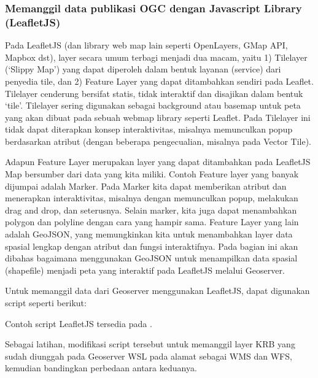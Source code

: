 \documentclass[letterpaper,10pt,english]{sphinxmanual}
\begin{document}
\subsubsection{Memanggil data publikasi OGC dengan Javascript Library (LeafletJS)}
\label{\detokenize{sesi3/konsumsiogc:memanggil-data-publikasi-ogc-dengan-javascript-library-leafletjs}}
Pada LeafletJS (dan library web map lain seperti OpenLayers, GMap API, Mapbox dst), layer secara umum terbagi menjadi dua macam, yaitu 1) Tilelayer (‘Slippy Map’) yang dapat diperoleh dalam bentuk layanan (service) dari penyedia tile, dan 2) Feature Layer yang dapat ditambahkan sendiri pada Leaflet. Tilelayer cenderung bersifat statis, tidak interaktif dan disajikan dalam bentuk ‘tile’. Tilelayer sering digunakan sebagai background atau basemap untuk peta yang akan dibuat pada sebuah webmap library seperti Leaflet. Pada Tilelayer ini tidak dapat diterapkan konsep interaktivitas, misalnya memunculkan popup berdasarkan atribut (dengan beberapa pengecualian, misalnya pada Vector Tile).

Adapun Feature Layer merupakan layer yang dapat ditambahkan pada LeafletJS Map bersumber dari data yang kita miliki. Contoh Feature layer yang banyak dijumpai adalah Marker. Pada Marker kita dapat memberikan atribut dan menerapkan interaktivitas, misalnya dengan memunculkan popup, melakukan drag and drop, dan seterusnya. Selain marker, kita juga dapat menambahkan polygon dan polyline dengan cara yang hampir sama. Feature Layer yang lain adalah GeoJSON, yang memungkinkan kita untuk menambahkan layer data spasial lengkap dengan atribut dan fungsi interaktifnya. Pada bagian ini akan dibahas bagaimana menggunakan GeoJSON untuk menampilkan data spasial (shapefile) menjadi peta yang interaktif pada LeafletJS melalui Geoserver.

Untuk memanggil data dari Geoserver menggunakan LeafletJS, dapat digunakan script seperti berikut:

\begin{sphinxVerbatim}[commandchars=\\\{\}]
        
         
\end{sphinxVerbatim}

Contoh script LeafletJS tersedia pada .

Sebagai latihan, modifikasi script tersebut untuk memanggil layer KRB yang sudah diunggah pada Geoserver WSL pada alamat  sebagai WMS dan WFS, kemudian bandingkan perbedaan antara keduanya.







\renewcommand{\indexname}{Index}
\printindex
\end{document}
